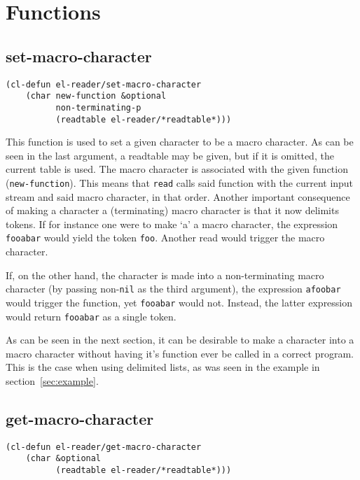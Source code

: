 \documentclass[a4paper,10pt,twoside]{report}
\newcommand{\sym}[1]{\texttt{#1}}
\newcommand{\fun}[1]{\texttt{#1}}
\newcommand{\Read}{\fun{read}}
\newcommand{\nil}{\sym{nil}}
\begin{document}
\section{Functions}
\label{subsec:functions}

\subsection{set-macro-character}
\label{subsec:set-macro-character}

\begin{lstlisting}[style=lispinline]
(cl-defun el-reader/set-macro-character
    (char new-function &optional
          non-terminating-p
          (readtable el-reader/*readtable*)))
\end{lstlisting}

This function is used to set a given character to be a macro character.  As can
be seen in the last argument, a readtable may be given, but if it is omitted,
the current table is used.  The macro character is associated with the given
function (\sym{new-function}).  This means that \Read{} calls said function with
the current input stream and said macro character, in that order.  Another
important consequence of making a character a (terminating) macro character is
that it now delimits tokens.  If for instance one were to make `a' a macro
character, the expression \texttt{fooabar} would yield the token \texttt{foo}.
Another read would trigger the macro character.

If, on the other hand, the character is made into a non-terminating macro
character (by passing non-\nil{} as the third argument), the expression
\texttt{afoobar} would trigger the function, yet \texttt{fooabar} would not.
Instead, the latter expression would return \texttt{fooabar} as a single token.

As can be seen in the next section, it can be desirable to make a character into
a macro character without having it’s function ever be called in a correct
program.  This is the case when using delimited lists, as was seen in the
example in section~\ref{sec:example}.

\subsection{get-macro-character}
\label{subsec:get-macro-character}

\begin{lstlisting}[style=lispinline]
(cl-defun el-reader/get-macro-character
    (char &optional
          (readtable el-reader/*readtable*)))
\end{lstlisting}
\end{document}
